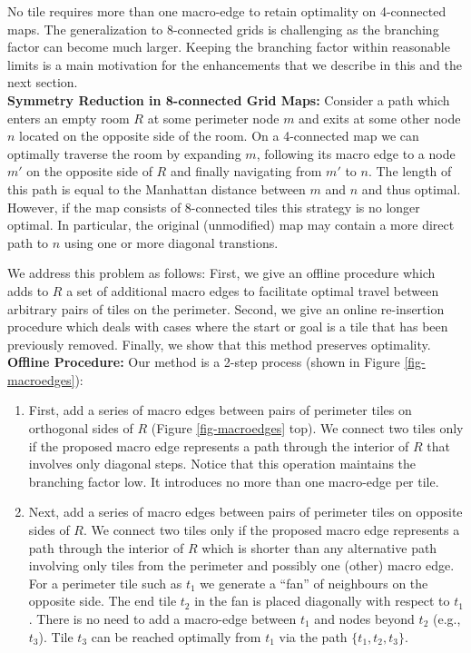 No tile requires more than one macro-edge to retain optimality on 4-connected maps.
The generalization to 8-connected grids is challenging as
the branching factor can become much larger. Keeping the branching factor within reasonable
limits is a main motivation for the enhancements that we describe in this and the next section.
\newline \\
\textbf{Symmetry Reduction in 8-connected Grid Maps:}
Consider a path which enters an empty room $R$ at some perimeter node $m$ and exits at some other
node $n$ located on the opposite side of the room.
On a 4-connected map we can optimally traverse the room by expanding $m$, following
its macro edge to a node $m'$ on the opposite side of $R$ and finally navigating from $m'$ to $n$.
The length of this path is equal to the Manhattan distance between $m$ and $n$ and thus optimal.
However, if the map consists of 8-connected tiles this strategy is no longer optimal.
In particular, the original (unmodified) map may contain a more direct path to $n$ using one or more diagonal
transtions.
\par
We address this problem as follows:
First, we give an offline procedure which adds to $R$ a set of additional macro edges
to facilitate optimal travel between arbitrary pairs of tiles on the perimeter.
Second, we give an online re-insertion procedure which deals with cases where the start or
goal is a tile that has been previously removed.
Finally, we show that this method preserves optimality.
\\ \newline
\textbf{Offline Procedure: }
Our method is a 2-step process (shown in Figure \ref{fig-macroedges}):

\begin{enumerate}
\item{First, add a series of macro edges between pairs of perimeter tiles on orthogonal sides of $R$
(Figure \ref{fig-macroedges} top). 
We connect two tiles only if the proposed macro edge represents a path through the interior of $R$ that involves
only diagonal steps. Notice that this operation maintains the branching factor low.
It introduces no more than one macro-edge per tile.}
\item{Next, add a series of macro edges between pairs of perimeter tiles on opposite sides of $R$.
We connect two tiles only if the proposed macro edge represents a path through the interior of $R$ which is shorter
than any alternative path involving only tiles from the perimeter and possibly one (other) macro edge.
For a perimeter tile such as $t_1$ we generate a ``fan'' of neighbours on the opposite side. The end tile $t_2$
in the fan is placed diagonally with respect to $t_1$. There is no need to add a macro-edge between $t_1$
and nodes beyond $t_2$ (e.g., $t_3$). Tile $t_3$ can be reached optimally from $t_1$ via the path
$\lbrace t_1, t_2, t_3 \rbrace$.}
\end{enumerate}

